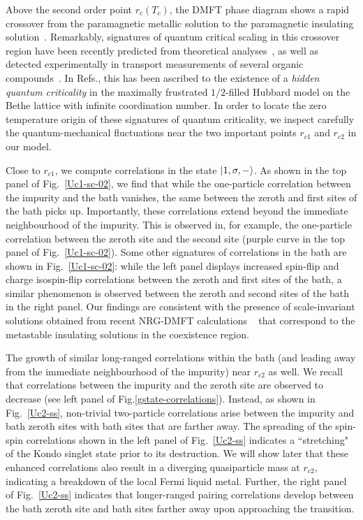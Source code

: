 \documentclass{iopart}
\begin{document}
Above the second order point \(r_c(T_c)\), the DMFT phase diagram shows a rapid crossover from the paramagnetic metallic solution to the paramagnetic insulating solution~\cite{georges1996,limelette_2003}. Remarkably, signatures of quantum critical scaling in this crossover region have been recently predicted from theoretical analyses~\cite{terletska_mott_2011,vucicevic_2013}, as well as detected experimentally in transport measurements of several organic compounds~\cite{Kagawa2005,Furukawa2015}. In Refs.\cite{terletska_mott_2011,vucicevic_2013}, this has been ascribed to the existence of a \textit{hidden quantum criticality} in the maximally frustrated $1/2$-filled Hubbard model on the Bethe lattice with infinite coordination number. In order to locate the zero temperature origin of these signatures of quantum criticality, we inspect carefully the quantum-mechanical fluctuations near the two important points \(r_{c1}\) and \(r_{c2}\) in our model.

Close to \(r_{c1}\), we compute correlations in the state \(\ket{1,\sigma,-}\).
As shown in the top panel of Fig.~\eqref{Uc1-sc-02}, we find that while the one-particle correlation between the impurity and the bath vanishes, the same between the zeroth and first sites of the bath picks up. Importantly, these correlations extend beyond the immediate neighbourhood of the impurity. This is observed in, for example, the one-particle correlation between the zeroth site and the second site (purple curve in the top panel of Fig.~\eqref{Uc1-sc-02}). Some other signatures of correlations in the bath are shown in Fig.~\eqref{Uc1-sc-02}: while the left panel displays increased spin-flip and charge isospin-flip correlations between the zeroth and first sites of the bath, a similar phenomenon is observed between the zeroth and second sites of the bath in the right panel. 
Our findings are consistent with the presence of scale-invariant solutions obtained from recent NRG-DMFT calculations ~\cite{Eisenlohr_2019} that correspond to the metastable insulating solutions in the coexistence region.

The growth of similar long-ranged correlations within the bath (and leading away from the immediate neighbourhood of the impurity) 
near \(r_{c2}\) as well.
We recall that correlations between the impurity and the zeroth site are observed to decrease (see left panel of Fig.\eqref{gstate-correlations}).
Instead, as shown in Fig.~\eqref{Uc2-ss}, non-trivial two-particle correlations arise between the impurity and bath zeroth sites with bath sites that are farther away.
The spreading of the spin-spin correlations shown in the left panel of Fig.~\eqref{Uc2-ss} indicates a ``stretching" of the Kondo singlet state prior to its destruction. We will show later that these enhanced correlations also result in a diverging quasiparticle mass at \(r_{c2}\), indicating a breakdown of the local Fermi liquid metal. Further, the right panel of Fig.~\eqref{Uc2-ss} indicates that longer-ranged pairing correlations develop between the bath zeroth site and bath sites farther away upon approaching the transition.
\end{document}
